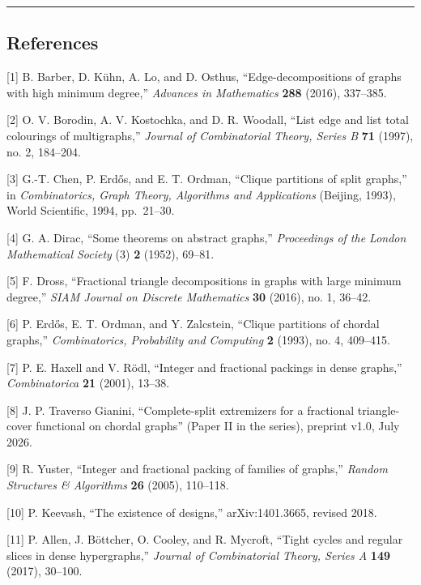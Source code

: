 \documentclass[
  11pt,
]{article}
\begin{document}
\begin{center}\rule{0.5\linewidth}{0.5pt}\end{center}

\subsection{References}\label{references}

{[}1{]} B. Barber, D. Kühn, A. Lo, and D. Osthus, ``Edge-decompositions
of graphs with high minimum degree,'' \emph{Advances in Mathematics}
\textbf{288} (2016), 337--385.

{[}2{]} O. V. Borodin, A. V. Kostochka, and D. R. Woodall, ``List edge
and list total colourings of multigraphs,'' \emph{Journal of
Combinatorial Theory, Series B} \textbf{71} (1997), no. 2, 184--204.

{[}3{]} G.-T. Chen, P. Erdős, and E. T. Ordman, ``Clique partitions of
split graphs,'' in \emph{Combinatorics, Graph Theory, Algorithms and
Applications} (Beijing, 1993), World Scientific, 1994, pp.~21--30.

{[}4{]} G. A. Dirac, ``Some theorems on abstract graphs,''
\emph{Proceedings of the London Mathematical Society} (3) \textbf{2}
(1952), 69--81.

{[}5{]} F. Dross, ``Fractional triangle decompositions in graphs with
large minimum degree,'' \emph{SIAM Journal on Discrete Mathematics}
\textbf{30} (2016), no. 1, 36--42.

{[}6{]} P. Erdős, E. T. Ordman, and Y. Zalcstein, ``Clique partitions of
chordal graphs,'' \emph{Combinatorics, Probability and Computing}
\textbf{2} (1993), no. 4, 409--415.

{[}7{]} P. E. Haxell and V. Rödl, ``Integer and fractional packings in
dense graphs,'' \emph{Combinatorica} \textbf{21} (2001), 13--38.

{[}8{]} J. P. Traverso Gianini, ``Complete-split extremizers for a
fractional triangle-cover functional on chordal graphs'' (Paper II in
the series), preprint v1.0, July 2026.

{[}9{]} R. Yuster, ``Integer and fractional packing of families of
graphs,'' \emph{Random Structures \& Algorithms} \textbf{26} (2005),
110--118.

{[}10{]} P. Keevash, ``The existence of designs,'' arXiv:1401.3665,
revised 2018.

{[}11{]} P. Allen, J. Böttcher, O. Cooley, and R. Mycroft, ``Tight
cycles and regular slices in dense hypergraphs,'' \emph{Journal of
Combinatorial Theory, Series A} \textbf{149} (2017), 30--100.
\end{document}
